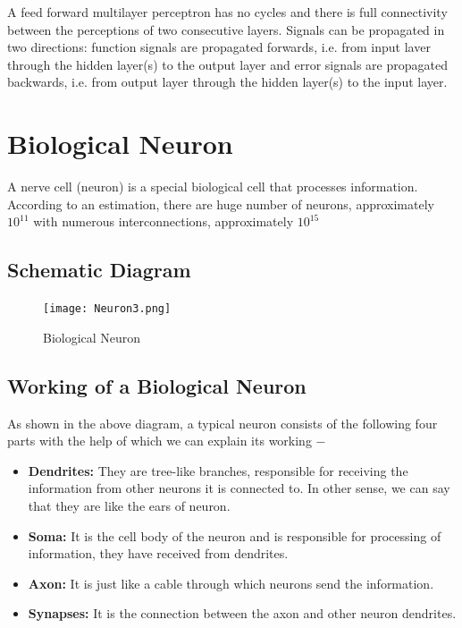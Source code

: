 \documentclass{report}
\begin{document}
A feed forward multilayer perceptron has no cycles and there is full connectivity between the perceptions of two consecutive layers. Signals can be propagated in two directions: function signals are propagated forwards, i.e. from input laver through the hidden layer(s) to the output layer and error signals are propagated backwards, i.e. from output layer through the hidden layer(s) to the input layer.

\section{Biological Neuron}
A nerve cell (neuron) is a special biological cell that processes information. According to an estimation, there are huge number of neurons, approximately $10^{11}$ with numerous interconnections, approximately $10^{15}$
\subsection{Schematic Diagram}

\begin{figure}[htp]
\centering
\texttt{[image: Neuron3.png]}
\caption{Biological Neuron}
\label{fig5}
\end{figure}

\subsection{Working of a Biological Neuron}

As shown in the above diagram, a typical neuron consists of the following four parts with the help of which we can explain its working −

\begin{itemize}
\item \textbf{Dendrites: } They are tree-like branches, responsible for receiving the information from other neurons it is connected to. In other sense, we can say that they are like the ears of neuron.

\item \textbf{Soma: } It is the cell body of the neuron and is responsible for processing of information, they have received from dendrites.

\item \textbf{Axon: } It is just like a cable through which neurons send the information.

\item \textbf{Synapses: } It is the connection between the axon and other neuron dendrites.

\end{itemize}
\end{document}
